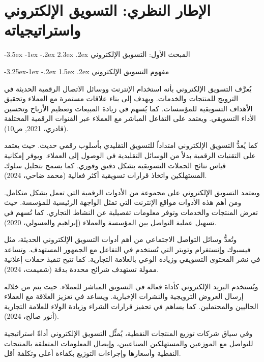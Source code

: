 \documentclass[12pt, a4paper]{report}
\makeatletter
\renewcommand\section{\@startsection{section}{1}{\z@}%
  {-3.5ex \@plus -1ex \@minus -.2ex}%
  {2.3ex \@plus .2ex}%
  {\normalfont\Large\bfseries\color{primaryblue}}}
\renewcommand\subsection{\@startsection{subsection}{2}{\z@}%
  {-3.25ex\@plus -1ex \@minus -.2ex}%
  {1.5ex \@plus .2ex}%
  {\normalfont\large\bfseries\color{sectiongray}}}
\makeatother
\begin{document}
\chapter{الإطار النظري: التسويق الإلكتروني واستراتيجياته}

\section{المبحث الأول: التسويق الإلكتروني}

\subsection{مفهوم التسويق الإلكتروني}

يُعرَّف التسويق الإلكتروني بأنه استخدام الإنترنت ووسائل الاتصال الرقمية الحديثة في الترويج للمنتجات والخدمات. ويهدف إلى بناء علاقات مستمرة مع العملاء وتحقيق الأهداف التسويقية للمؤسسات. كما يُسهم في زيادة المبيعات وتعظيم الأرباح وتحسين الأداء التسويقي. ويعتمد على التفاعل المباشر مع العملاء عبر القنوات الرقمية المختلفة (قادري، 2021, ص10).

كما يُعدُّ التسويق الإلكتروني امتداداً للتسويق التقليدي بأسلوب رقمي حديث. حيث يعتمد على التقنيات الرقمية بدلاً من الوسائل التقليدية في الوصول إلى العملاء. ويوفر إمكانية قياس نتائج الحملات التسويقية بشكل دقيق وفوري. كما يسمح بتحليل سلوك المستهلكين واتخاذ قرارات تسويقية أكثر فعالية (محمد ضاحي، 2024).

ويعتمد التسويق الإلكتروني على مجموعة من الأدوات الرقمية التي تعمل بشكل متكامل. ومن أهم هذه الأدوات مواقع الإنترنت التي تمثل الواجهة الرئيسية للمؤسسة. حيث تعرض المنتجات والخدمات وتوفر معلومات تفصيلية عن النشاط التجاري. كما تُسهم في تسهيل عملية التواصل بين المؤسسة والعملاء (إبراهيم والعسولي، 2020).

وتُعدُّ وسائل التواصل الاجتماعي من أهم أدوات التسويق الإلكتروني الحديثة، مثل فيسبوك وإنستغرام وتويتر التي تُستخدم في التفاعل مع الجمهور المستهدف. وتساعد في نشر المحتوى التسويقي وزيادة الوعي بالعلامة التجارية. كما تتيح تنفيذ حملات إعلانية ممولة تستهدف شرائح محددة بدقة (شميمت، 2024).

ويُستخدم البريد الإلكتروني كأداة فعالة في التسويق المباشر للعملاء. حيث يتم من خلاله إرسال العروض الترويجية والنشرات الإخبارية. ويساعد في تعزيز العلاقة مع العملاء الحاليين والمحتملين. كما يساهم في تحفيز قرارات الشراء وزيادة الولاء للعلامة التجارية (أنور صالح، 2024).

وفي سياق شركات توزيع المنتجات النفطية، يُمثِّل التسويق الإلكتروني أداةً استراتيجية للتواصل مع الموزعين والمستهلكين الصناعيين، وإيصال المعلومات المتعلقة بالمنتجات النفطية وأسعارها وإجراءات التوزيع بكفاءة أعلى وتكلفة أقل.
\end{document}
